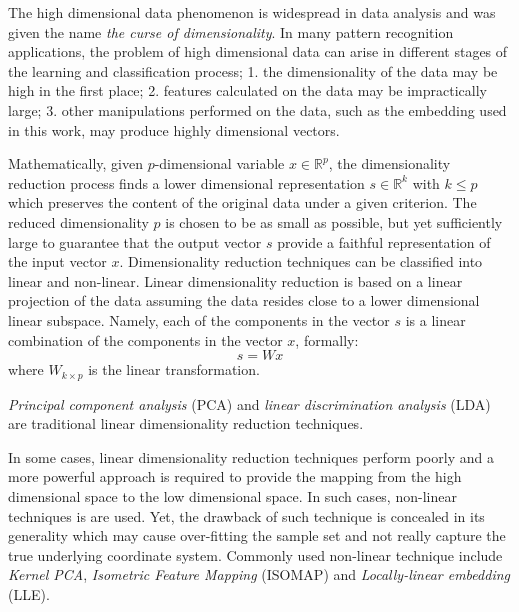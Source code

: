 \iftoggle{edit-mode}{\hspace{0pt}\marginpar{The curse of dimensionality}}{}
The high dimensional data phenomenon is widespread in data analysis and was given the name \emph{the curse of dimensionality}. 
In many pattern recognition applications, the problem of high dimensional data can arise in different stages of the learning and classification process; 1. the dimensionality of the data may be high in the first place; 2. features calculated on the data may be impractically large; 3. other manipulations performed on the data, such as the embedding used in this work, may produce highly dimensional vectors.

\iftoggle{edit-mode}{\hspace{0pt}\marginpar{Mathematical Definition}}{}
Mathematically, given $p$-dimensional variable $x \in \mathds{R}^p$, the dimensionality reduction process finds a lower dimensional representation $s \in \mathds{R}^k$ with $k \leq p$ which preserves the content of the original data under a given criterion. 
The reduced dimensionality $p$ is chosen to be as small as possible, but yet sufficiently large to guarantee that the output vector $s$ provide a faithful representation of the input vector $x$. 
Dimensionality reduction techniques can be classified into linear and non-linear. Linear dimensionality reduction is based on a linear projection of the data assuming the data resides close to a lower dimensional linear subspace. 
Namely, each of the components in the vector $s$ is a linear combination of the components in the vector $x$, formally:
\begin{equation}
s=Wx
\end{equation}
where $W_{k \times p}$ is the linear transformation.

\iftoggle{edit-mode}{\hspace{0pt}\marginpar{Linear DR}}{}
\emph{Principal component analysis} (PCA) and \emph{linear discrimination analysis} (LDA) are traditional linear dimensionality reduction techniques.

\iftoggle{edit-mode}{\hspace{0pt}\marginpar{Non-Linear DR}}{}
In some cases, linear dimensionality reduction techniques perform poorly and a more powerful approach is required to provide the mapping from the high dimensional space to the low dimensional space. In such cases, non-linear techniques is are used. Yet, the drawback of such technique is concealed in its generality which may cause over-fitting the sample set and not really capture the true underlying coordinate system. Commonly used non-linear technique include \emph{Kernel PCA}, \emph{Isometric Feature Mapping} (ISOMAP) and \emph{Locally-linear embedding} (LLE).


